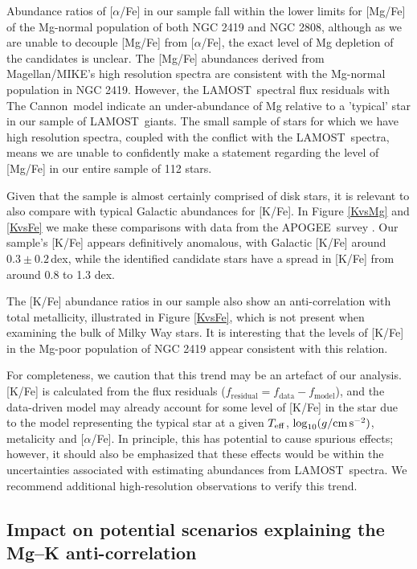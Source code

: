 \documentclass[a4paper,fleqn,usenatbib]{mnras}
\newcommand{\project}[1]{#1}
\newcommand{\lamost}{\project{LAMOST}}
\newcommand{\apogee}{\project{APOGEE}}
\newcommand{\tc}{\project{The Cannon}}
\newcommand{\teff}{T_{\rm eff}}
\newcommand{\logg}{\log_{10}(g/{\rm cm\,s}^{-2})}
\begin{document}
Abundance ratios of [$\alpha$/Fe] in our sample fall within the lower limits for [Mg/Fe] of the Mg-normal population of both NGC 2419 and NGC 2808, although as we are unable to decouple [Mg/Fe] from $[\alpha$/Fe], the exact level of Mg depletion of the candidates is unclear. The [Mg/Fe] abundances derived from Magellan/MIKE's high resolution spectra are consistent with the Mg-normal population in NGC 2419. However, the \lamost\ spectral flux residuals with \tc\ model indicate an under-abundance of Mg relative to a 'typical' star in our sample of \lamost\ giants. The small sample of stars for which we have high resolution spectra, coupled with the conflict with the \lamost\ spectra, means we are unable to confidently make a statement regarding the level of [Mg/Fe] in our entire sample of 112 stars.

Given that the sample is almost certainly comprised of disk stars, it is relevant to also compare with typical Galactic abundances for [K/Fe]. In Figure \ref{KvsMg} and \ref{KvsFe} we make these comparisons with data from the \apogee\ survey \citep{alam2015}. Our sample's [K/Fe] appears definitively anomalous, with Galactic [K/Fe] around $0.3 \pm 0.2$\,dex, while the identified candidate stars have a spread in [K/Fe] from around 0.8 to 1.3 dex.

The [K/Fe] abundance ratios in our sample also show an anti-correlation with total metallicity, illustrated in Figure \ref{KvsFe}, which is not present when examining the bulk of Milky Way stars. It is interesting that the levels of [K/Fe] in the Mg-poor population of NGC 2419 appear consistent with this relation. 

For completeness, we caution that this trend may be an artefact of our analysis. [K/Fe] is calculated from the flux residuals ($f_{\textrm{residual}} = f_{\textrm{data}} - f_{\textrm{model}}$), and the data-driven model may already account for some level of [K/Fe] in the star due to the model representing the typical star at a given $\teff$, $\logg$, metalicity and [$\alpha$/Fe]. In principle, this has potential to cause spurious effects; however, it should also be emphasized that these effects would be within the uncertainties associated with estimating abundances from \lamost\ spectra. We recommend additional high-resolution observations to verify this trend.




\subsection{Impact on potential scenarios explaining the Mg--K anti-correlation}
\end{document}
